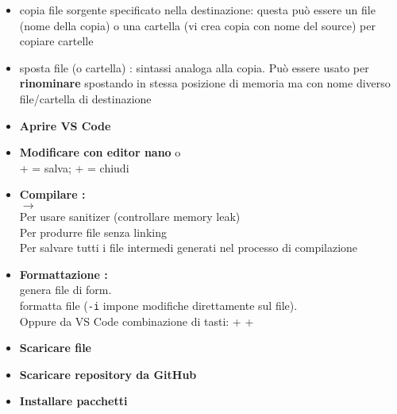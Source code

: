 \documentclass[10pt, oneside]{Book}
\begin{document}
\begin{itemize}
\item {} copia file sorgente specificato nella destinazione: questa può essere un file (nome della copia) o una cartella (vi crea copia con nome del source)  per copiare cartelle

\item {} sposta file (o cartella) : sintassi analoga alla copia. Può essere usato per \textbf{rinominare} spostando in stessa posizione di memoria ma con nome diverso file/cartella di destinazione

\item \textbf{Aprire VS Code} 

\item \textbf{Modificare con editor nano}  o 
\\ +  = salva;  +  = chiudi


\item \textbf{Compilare : } 
\\ $\rightarrow$ 
\\Per usare sanitizer (controllare memory leak) 
\\Per produrre file senza linking 
\\Per salvare tutti i file intermedi generati nel processo di compilazione 

\item \textbf{Formattazione : }
\\ genera file di form.
\\ formatta file (\texttt{-i} impone modifiche direttamente sul file). 
\\Oppure da VS Code combinazione di tasti:  + \boxed{\texttt{$\uparrow$ \quad}} +  

\item \textbf{Scaricare file}  
\item \textbf{Scaricare repository da GitHub} 
\item \textbf{Installare pacchetti} 


\end{itemize}
\end{document}
